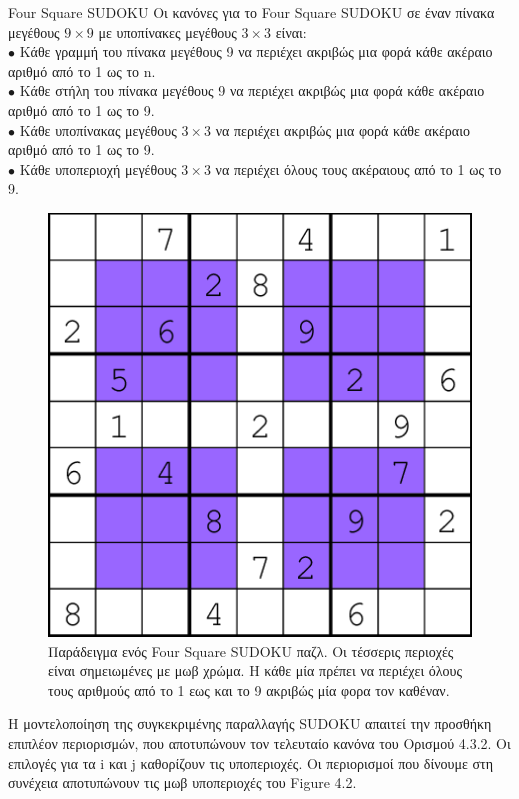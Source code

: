 \documentclass[12pt]{book}
\theoremstyle{definition}
\begin{document}
\begin{mytheorem}{Four Square SUDOKU}{}
	Οι κανόνες για το Four Square SUDOKU σε έναν πίνακα μεγέθους \(9 \times 9\) με υποπίνακες μεγέθους \(3 \times 3\) είναι: \\
	\(\bullet\) Κάθε γραμμή του πίνακα μεγέθους 9 να περιέχει ακριβώς μια φορά κάθε ακέραιο αριθμό από το 1 ως το n. \\
	\(\bullet\) Κάθε στήλη του πίνακα μεγέθους 9 να περιέχει ακριβώς μια φορά κάθε ακέραιο αριθμό από το 1 ως το 9. \\
	\(\bullet\) Κάθε υποπίνακας μεγέθους \(3 \times 3\) να περιέχει ακριβώς μια φορά κάθε ακέραιο αριθμό από το 1 ως το 9. \\
	\(\bullet\) Κάθε υποπεριοχή μεγέθους
\(3 \times 3\) να περιέχει όλους τους ακέραιους από το 1 ως το 9. \\
\end{mytheorem}

\begin{figure}[h]
	\centering	
	\includegraphics[scale=0.7]{Figures/An-example-Four-Square-Sudoku-puzzle.png}
	\caption{Παράδειγμα ενός Four Square SUDOKU παζλ. Οι τέσσερις περιοχές είναι σημειωμένες με μωβ χρώμα. Η κάθε μία πρέπει να περιέχει όλους τους αριθμούς από το 1 εως και το 9 ακριβώς μία φορα τον καθέναν.}
\end{figure}

Η μοντελοποίηση της συγκεκριμένης παραλλαγής SUDOKU απαιτεί την προσθήκη επιπλέον περιορισμών, που αποτυπώνουν τον τελευταίο κανόνα του Ορισμού 4.3.2. Οι επιλογές για τα i και j καθορίζουν τις υποπεριοχές. Οι περιορισμοί που δίνουμε στη συνέχεια αποτυπώνουν τις μωβ υποπεριοχές του Figure 4.2.\\
\end{document}
